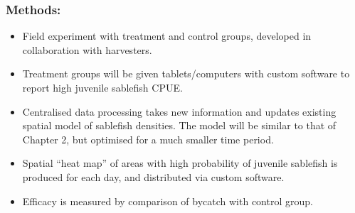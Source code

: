 \documentclass[11pt]{article}
\begin{document}
\subsubsection*{Methods:}
\begin{itemize}
  \item Field experiment with treatment and control groups, developed in collaboration with harvesters.
  \item Treatment groups will be given tablets/computers with custom software to report high juvenile sablefish CPUE.
  \item Centralised data processing takes new information and updates existing spatial model of sablefish densities. The model will be similar to that of Chapter 2, but optimised for a much smaller time period.
  \item Spatial ``heat map'' of areas with high probability of juvenile sablefish is produced for each day, and distributed via custom software.
  \item Efficacy is measured by comparison of bycatch with control group.
\end{itemize}



\end{document}
